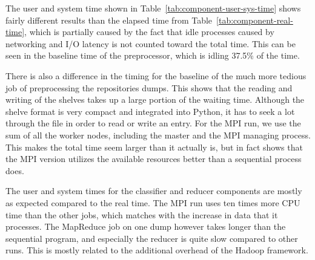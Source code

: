 \documentclass{article}
\begin{document}
The user and system time shown in Table~\ref{tab:component-user-sys-time} shows 
fairly different results than the elapsed time from 
Table~\ref{tab:component-real-time}, which is partially caused by the fact that 
idle processes caused by networking and I/O latency is not counted toward the 
total time. This can be seen in the baseline time of the preprocessor, which
is idling 37.5\% of the time.

There is also a difference in the timing for the baseline of the much more 
tedious job of preprocessing the repositories dumps. This shows that the 
reading and writing of the shelves takes up a large portion of the waiting 
time. Although the shelve format is very compact and integrated into Python, it 
has to seek a lot through the file in order to read or write an entry. For the 
MPI run, we use the sum of all the worker nodes, including the master and the 
MPI managing process. This makes the total time seem larger than it actually 
is, but in fact shows that the MPI version utilizes the available resources 
better than a sequential process does.

The user and system times for the classifier and reducer components are mostly 
as expected compared to the real time. The MPI run uses ten times more CPU time 
than the other jobs, which matches with the increase in data that it processes. 
The MapReduce job on one dump however takes longer than the sequential program, 
and especially the reducer is quite slow compared to other runs. This is mostly 
related to the additional overhead of the Hadoop framework.
\end{document}
